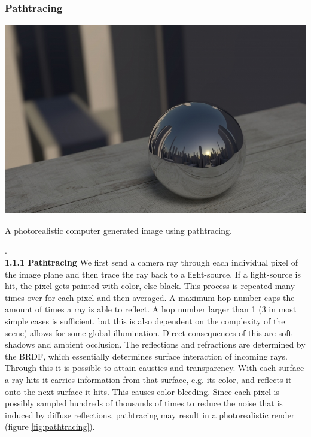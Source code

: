 \documentclass{ACGSeminar}
\begin{document}
	\subsubsection{Pathtracing}%
		\begin{floatingfigure}[r]{.6\textwidth}%
				\includegraphics[width=.6\textwidth]{img/pathtracing.png}
				\caption{A photorealistic computer generated image using pathtracing.}%
				\label{fig:pathtracing}%
		\end{floatingfigure}%
		.\\
		\textbf{1.1.1 \quad Pathtracing} We first send a camera ray through each individual pixel of the image plane and then trace the ray back to a light-source. If a light-source is hit, the pixel gets painted with color, else black. This process is repeated many times over for each pixel and then averaged. A maximum hop number caps the amount of times a ray is able to reflect. A hop number larger than 1 (3 in most simple cases is sufficient, but this is also dependent on the complexity of the scene) allows for some global illumination. Direct consequences of this are soft shadows and ambient occlusion. The reflections and refractions are determined by the BRDF, which essentially determines surface interaction of incoming rays. Through this it is possible to attain caustics and transparency. With each surface a ray hits it carries information from that surface, e.g. its color, and reflects it onto the next surface it hits. This causes color-bleeding. Since each pixel is possibly sampled hundreds of thousands of times to reduce the noise that is induced by diffuse reflections, pathtracing may result in a photorealistic render (figure \ref{fig:pathtracing}).
\end{document}
